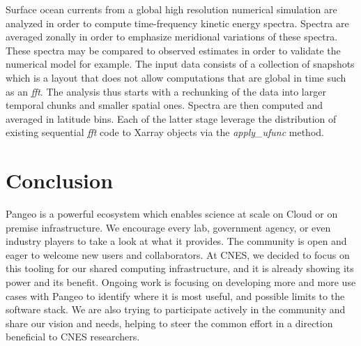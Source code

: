 \documentclass{article}
\begin{document}
Surface ocean currents from a global high resolution numerical simulation are analyzed in order to compute time-frequency kinetic energy spectra.
Spectra are averaged zonally in order to emphasize meridional variations of these spectra.
These spectra may be compared to observed estimates in order to validate the numerical model for example.
The input data consists of a collection of snapshots which is a layout that does not allow computations that are global in time such as an \textit{fft}.
The analysis thus starts with a rechunking of the data into larger temporal chunks and smaller spatial ones.
Spectra are then computed and averaged in latitude bins.
Each of the latter stage leverage the distribution of existing sequential \textit{fft} code to Xarray objects via the \textit{apply_ufunc} method.


\section{Conclusion}
\label{sec:conclusion}

Pangeo is a powerful ecosystem which enables science at scale on Cloud or on premise infrastructure. We encourage every lab, government agency, or even industry players to take a look at what it provides. The community is open and eager to welcome new users and collaborators.
At CNES, we decided to focus on this tooling for our shared computing infrastructure, and it is already showing its power and its benefit. Ongoing work is focusing on developing more and more use cases with Pangeo to identify where it is most useful, and possible limits to the software stack. We are also trying to participate actively in the community and share our vision and needs, helping to steer the common effort in a direction beneficial to CNES researchers.







\small
\end{document}
